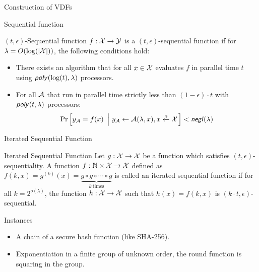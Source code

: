 \documentclass[UTF8]{beamer}
\begin{document}
	\begin{frame}
		\centering
		\huge Construction of VDFs
	\end{frame}
	\begin{frame}{Sequential function}
		\begin{block}{$(t,\epsilon)$-Sequential function}
			$f:\mathcal{X}\to\mathcal{Y}$ is a $(t,\epsilon)$-sequential function if for $\lambda=O(\log(|\mathcal{X}|))$, the following conditions hold:
			\begin{itemize}
				\item There exists an algorithm that for all $x\in\mathcal{X}$ evaluates $f$ in parallel time $t$ using $\textsf{\textit{poly}}(\log(t),\lambda)$ processors.
				\item For all $\mathcal{A}$ that run in parallel time strictly less than $(1-\epsilon)\cdot t$ with $\textsf{\textit{poly}}(t,\lambda)$ processors:
				\begin{equation*}
					\Pr\left[
					y_{\mathcal{A}}=f(x)
					~\left|~
					y_{\mathcal{A}}\gets\mathcal{A}(\lambda,x), x\xleftarrow{\text{\tiny$\mathsf{\$}$}}\mathcal{X}
					\right.\right]<\textsf{\textit{negl}}(\lambda)
				\end{equation*}
			\end{itemize}
		\end{block}
	\end{frame}
	\begin{frame}{Iterated Sequential Function}
		\begin{block}{Iterated Sequential Function}
			Let $g:\mathcal{X}\to\mathcal{X}$ be a function which satisfies $(t,\epsilon)$-sequentiality. A function $f:\mathbb{N}\times\mathcal{X}\to\mathcal{X}$ defined as $f(k,x)=g^{(k)}(x)=\underbrace{g\circ g\circ\cdots\circ g}_{k~\text{times}}$ is called an iterated sequential function if for all $k=2^{o(\lambda)}$, the function $h:\mathcal{X}\to\mathcal{X}$ such that $h(x)=f(k,x)$ is $(k\cdot t,\epsilon)$-sequential.
		\end{block}
		\begin{block}{Instances}
			\begin{itemize}
				\item A chain of a secure hash function (like SHA-256).
				\item Exponentiation in a finite group of unknown order, the round function is squaring in the group.
			\end{itemize}
		\end{block}
	\end{frame}
\end{document}
